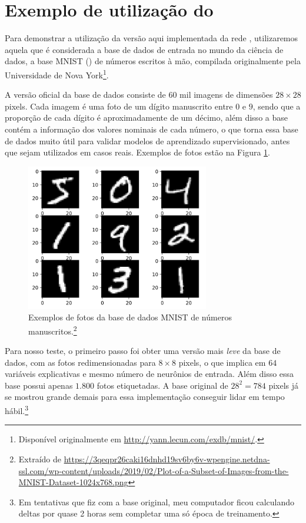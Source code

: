 \section{Exemplo de utilização do }
\label{secao:mnist}

Para demonstrar a utilização da versão aqui implementada da rede , utilizaremos aquela que é considerada a base de dados de entrada no mundo da ciência de dados, a base MNIST () de números escritos à mão, compilada originalmente pela Universidade de Nova York\footnote{Disponível originalmente em \url{http://yann.lecun.com/exdb/mnist/}.}.

A versão oficial da base de dados consiste de $60$ mil imagens de dimensões $28 \times 28$ pixels. Cada imagem é uma foto de um dígito manuscrito entre $0$ e $9$, sendo que a proporção de cada dígito é aproximadamente de um décimo, além disso a base contém a informação dos valores nominais de cada número, o que torna essa base de dados muito útil para validar modelos de aprendizado supervisionado, antes que sejam utilizados em casos reais. Exemplos de fotos estão na Figura \ref{fig:mnist_fig}.

\begin{figure}[htb]
\centering
\includegraphics[width=8cm]{figuras/mnist}
\caption{Exemplos de fotos da base de dados MNIST de números manuscritos.\footnote{Extraído de \url{https://3qeqpr26caki16dnhd19sv6by6v-wpengine.netdna-ssl.com/wp-content/uploads/2019/02/Plot-of-a-Subset-of-Images-from-the-MNIST-Dataset-1024x768.png}}}
\label{fig:mnist_fig}
\end{figure}

Para nosso teste, o primeiro passo foi obter uma versão mais \emph{leve} da base de dados, com as fotos redimensionadas para $8 \times 8$ pixels, o que implica em $64$ variáveis explicativas e mesmo número de neurônios de entrada. Além disso essa base possui apenas $1.800$ fotos etiquetadas. A base original de $28^2 = 784$ pixels já se mostrou grande demais para essa implementação conseguir lidar em tempo hábil.\footnote{Em tentativas que fiz com a base original, meu computador ficou calculando deltas por quase 2 horas sem completar uma só época de treinamento.}

